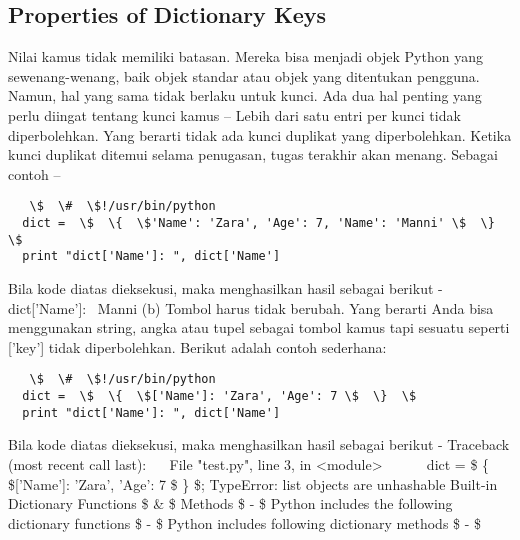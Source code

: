 \subsection{Properties of Dictionary Keys} 
Nilai kamus tidak memiliki batasan. Mereka bisa menjadi objek Python yang sewenang-wenang, baik objek standar atau objek yang ditentukan pengguna. Namun, hal yang sama tidak berlaku untuk kunci. 
Ada dua hal penting yang perlu diingat tentang kunci kamus – 
Lebih dari satu entri per kunci tidak diperbolehkan. Yang berarti tidak ada kunci duplikat yang diperbolehkan. Ketika kunci duplikat ditemui selama penugasan, tugas terakhir akan menang. Sebagai contoh – 
\begin{verbatim}   
   \$  \#  \$!/usr/bin/python 
  dict =  \$  \{  \$'Name': 'Zara', 'Age': 7, 'Name': 'Manni' \$  \}  \$ 
  print "dict['Name']: ", dict['Name']
\end{verbatim}  
Bila kode diatas dieksekusi, maka menghasilkan hasil sebagai berikut - 
  dict['Name']:~ Manni 
(b) Tombol harus tidak berubah. Yang berarti Anda bisa menggunakan string, angka atau tupel sebagai tombol kamus tapi sesuatu seperti ['key'] tidak diperbolehkan. Berikut adalah contoh sederhana: 
\begin{verbatim}   
   \$  \#  \$!/usr/bin/python 
  dict =  \$  \{  \$['Name']: 'Zara', 'Age': 7 \$  \}  \$ 
  print "dict['Name']: ", dict['Name']
\end{verbatim}
Bila kode diatas dieksekusi, maka menghasilkan hasil sebagai berikut - 
  Traceback (most recent call last): 
~~     File "test.py", line 3, in <module> 
~~~~~     dict =  \$  \{  \$['Name']: 'Zara', 'Age': 7 \$  \}  \$; 
  TypeError: list objects are unhashable 
Built-in Dictionary Functions  \$  \&  \$ Methods  \$ - \$ 
Python includes the following dictionary functions  \$ - \$ 
Python includes following dictionary methods  \$ - \$ 

